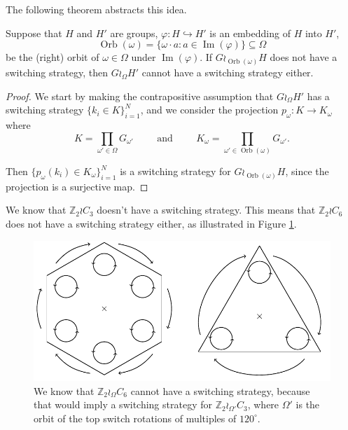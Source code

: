 The following theorem abstracts this idea.
\begin{theorem}
  Suppose that $H$ and $H'$ are groups,
  $\varphi \colon H \hookrightarrow H'$ is an embedding of $H$ into $H'$,
  \begin{equation}
    \operatorname{Orb}(\omega)
      = \{\omega \cdot a : a \in \operatorname{Im}(\varphi) \} \subseteq \Omega
  \end{equation}
  be the (right) orbit of $\omega \in \Omega$ under $\operatorname{Im}(\varphi)$.
  If $G \wr_{\operatorname{Orb}(\omega)} H$ does not have a switching strategy,
  then $G \wr_\Omega H'$ cannot have a switching strategy either.
  \label{thm:SpinReduction2}
\end{theorem}
\begin{proof}
  We start by making the contrapositive assumption that $G \wr_\Omega H'$
  has a switching strategy ${\{k_i \in K\}_{i=1}^N}$,
  and we consider the projection
  $p_\omega \colon K \rightarrow K_\omega$ where
  \begin{equation}
    K = \prod_{\omega' \in \Omega} G_{\omega'}
    \hspace{1cm}\text{and}\hspace{1cm}
    K_{\omega} = \prod_{\omega' \in \operatorname{Orb}(\omega)} G_{\omega'}.
  \end{equation}

  Then $\{p_\omega(k_i) \in K_\omega\}_{i=1}^N$ is a switching strategy for
  $G \wr_{\operatorname{Orb}(\omega)} H$, since the projection is a surjective
  map.
\end{proof}

\begin{example}
  We know that $\mathbb Z_2 \wr C_3$ doesn't have a switching strategy.
  This means that $\mathbb Z_2 \wr C_6$ does not have a switching strategy either,
  as illustrated in Figure \ref{fig:Z2C6_2}.
\end{example}
\begin{figure}
  \center
  \includegraphics{assets/tikz_Z2C6_2.pdf}
  \caption[A reduction from a hexagonal table to a triangular table.]{
    We know that $\mathbb Z_2 \wr_\Omega C_6$ cannot have
    a switching strategy, because that would imply a switching strategy for
    $\mathbb Z_2 \wr_{\Omega'} C_3$, where $\Omega'$
    is the orbit of the top switch rotations of multiples of $120^\circ$.
  }
  \label{fig:Z2C6_2}
\end{figure}

